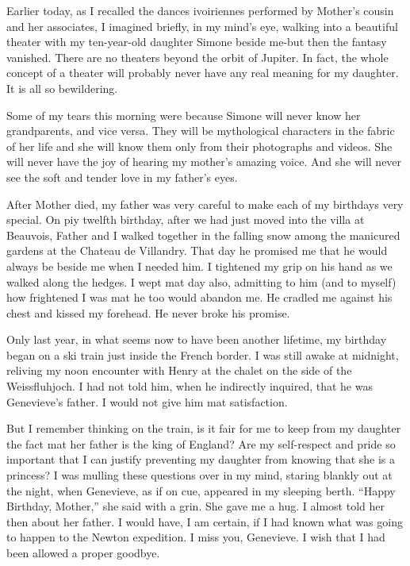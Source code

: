 \documentclass[]{article}
\begin{document}
Earlier today, as I recalled the dances ivoiriennes performed by Mother’s cousin and her associates, I imagined briefly, in my mind’s eye, walking into a beautiful theater with my ten-year-old daughter Simone beside me-but then the fantasy vanished. There are no theaters beyond the orbit of Jupiter. In fact, the whole concept of a theater will probably never have any real meaning for my daughter. It is all so bewildering.

Some of my tears this morning were because Simone will never know her grandparents, and vice versa. They will be mythological characters in the fabric of her life and she will know them only from their photographs and videos. She will never have the joy of hearing my mother’s amazing voice. And she will never see the soft and tender love in my father’s eyes.

After Mother died, my father was very careful to make each of my birthdays very special. On piy twelfth birthday, after we had just moved into the villa at Beauvois, Father and I walked together in the falling snow among the manicured gardens at the Chateau de Villandry. That day he promised me that he would always be beside me when I needed him. I tightened my grip on his hand as we walked along the hedges. I wept mat day also, admitting to him (and to myself) how frightened I was mat he too would abandon me. He cradled me against his chest and kissed my forehead. He never broke his promise.

Only last year, in what seems now to have been another lifetime, my birthday began on a ski train just inside the French border. I was still awake at midnight, reliving my noon encounter with Henry at the chalet on the side of the Weissfluhjoch. I had not told him, when he indirectly inquired, that he was Genevieve’s father. I would not give him mat satisfaction.

But I remember thinking on the train, is it fair for me to keep from my daughter the fact mat her father is the king of England? Are my self-respect and pride so important that I can justify preventing my daughter from knowing that she is a princess? I was mulling these questions over in my mind, staring blankly out at the night, when Genevieve, as if on cue, appeared in my sleeping berth. “Happy Birthday, Mother,” she said with a grin. She gave me a hug. I almost told her then about her father. I would have, I am certain, if I had known what was going to happen to the Newton expedition. I miss you, Genevieve. I wish that I had been allowed a proper goodbye.
\end{document}

